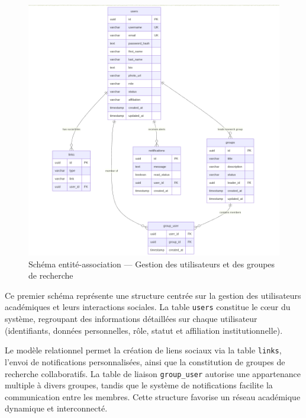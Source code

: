 \documentclass{rapportPfe}
\begin{document}
\begin{figure}[H]
    \centering
    \includegraphics[width=1.0\textwidth]{diagrams/diagram5.png}
    \caption{Schéma entité-association — Gestion des utilisateurs et des groupes de recherche}
    \label{fig:diagram5}
\end{figure}

Ce premier schéma représente une structure centrée sur la gestion des utilisateurs académiques et leurs interactions sociales. La table \texttt{users} constitue le cœur du système, regroupant des informations détaillées sur chaque utilisateur (identifiants, données personnelles, rôle, statut et affiliation institutionnelle). 

Le modèle relationnel permet la création de liens sociaux via la table \texttt{links}, l’envoi de notifications personnalisées, ainsi que la constitution de groupes de recherche collaboratifs. La table de liaison \texttt{group\_user} autorise une appartenance multiple à divers groupes, tandis que le système de notifications facilite la communication entre les membres. Cette structure favorise un réseau académique dynamique et interconnecté.
\end{document}
